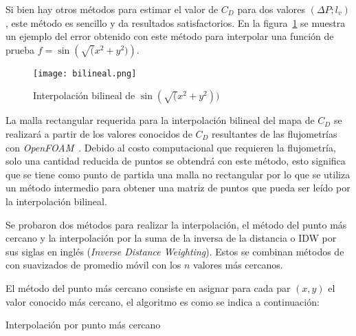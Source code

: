 {Si bien hay otros métodos para estimar el valor de $C_D$ para dos valores $(\Delta
P; l_v)$, este método es sencillo y da resultados satisfactorios.
%
En la figura~\ref{fig:bilineal} se muestra un ejemplo del error obtenido con
este método para interpolar una función de prueba $f=\sin\left(\sqrt(x^2 + y^2)\right)$.

\begin{figure}
    \centering
    \texttt{[image: bilineal.png]}
    \caption{Interpolación bilineal de $\sin(\sqrt(x^2 + y^2))$}\label{fig:bilineal}
\end{figure}

La malla rectangular requerida para la interpolación bilineal del mapa de
$C_{D}$ se realizará a partir de los valores conocidos de $C_D$ resultantes de
las flujometrías con \emph{OpenFOAM}~\parencite{openfoam}.
%
Debido al costo computacional que requieren la flujometría, solo una cantidad
reducida de puntos se obtendrá con este método, esto  significa que se tiene
como punto de partida una malla no rectangular por lo que se utiliza un método
intermedio para obtener una matriz de puntos que pueda ser leído por la
interpolación bilineal.

Se probaron dos métodos para realizar la interpolación, el método del punto más
cercano y la interpolación por la suma de la inversa de la distancia o IDW por
sus siglas en inglés (\emph{Inverse Distance Weighting}).
%
Estos se combinan métodos de con suavizados de promedio móvil con los $n$
valores más cercanos.

El método del punto más cercano consiste en asignar para cada par $(x, y)$ el
valor conocido más cercano, el algoritmo es como se indica a continuación:

\begin{algorithm}
 \caption{Interpolación por punto más cercano}\label{algo:mas_cercano}



\end{algorithm}}
